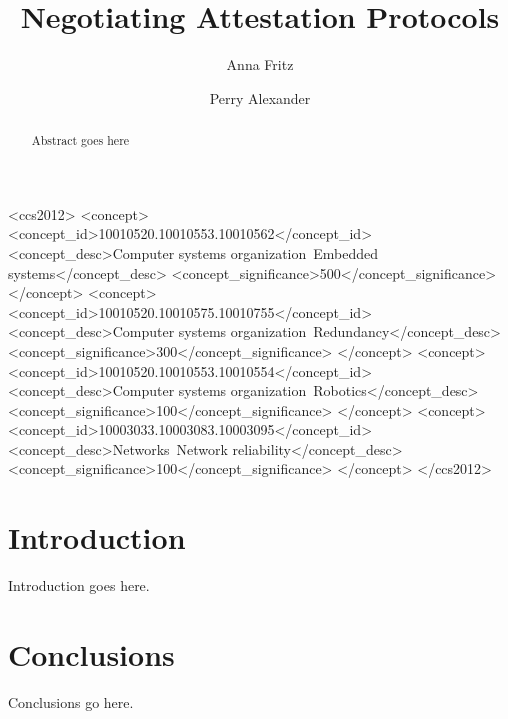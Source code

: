 \documentclass[sigconf,authordraft]{acmart}
\begin{document}
\title{Negotiating Attestation Protocols}

\author{Anna Fritz}
\author{Perry Alexander}
\authornotemark[1]

\renewcommand{\shortauthors}{Fritz and Alexander}

\begin{abstract}
  Abstract goes here
\end{abstract}

\begin{CCSXML}
<ccs2012>
 <concept>
  <concept_id>10010520.10010553.10010562</concept_id>
  <concept_desc>Computer systems organization~Embedded systems</concept_desc>
  <concept_significance>500</concept_significance>
 </concept>
 <concept>
  <concept_id>10010520.10010575.10010755</concept_id>
  <concept_desc>Computer systems organization~Redundancy</concept_desc>
  <concept_significance>300</concept_significance>
 </concept>
 <concept>
  <concept_id>10010520.10010553.10010554</concept_id>
  <concept_desc>Computer systems organization~Robotics</concept_desc>
  <concept_significance>100</concept_significance>
 </concept>
 <concept>
  <concept_id>10003033.10003083.10003095</concept_id>
  <concept_desc>Networks~Network reliability</concept_desc>
  <concept_significance>100</concept_significance>
 </concept>
</ccs2012>
\end{CCSXML}



\maketitle

\section{Introduction}

Introduction goes here.

\section{Conclusions}

Conclusions go here.



\end{document}
